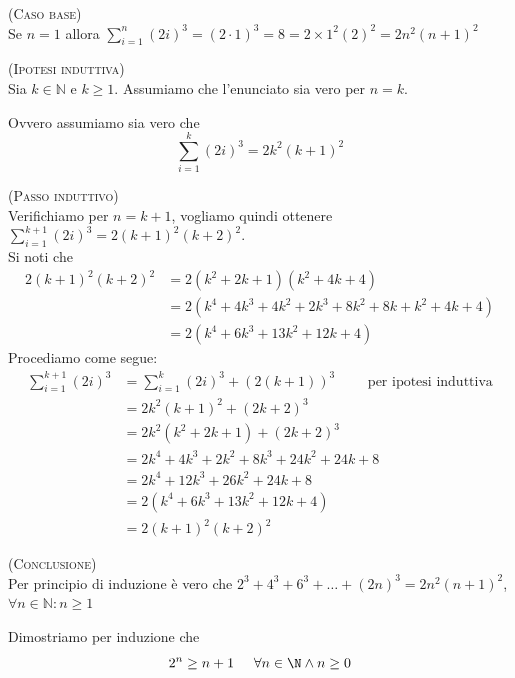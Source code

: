 \begin{soluzione}
\textsc{(Caso base)}\\
Se $n=1$ allora $\sum\limits_{i=1}^{n} (2i)^3 = (2\cdot 1)^3 = 8 =2 \times 1^2 (2)^2 = 2n^2(n+1)^2$

\textsc{(Ipotesi induttiva)}\\
Sia $k \in \mathbb{N}$ e $k \geqslant 1$. Assumiamo che l'enunciato sia vero per $n = k$.  

Ovvero assumiamo sia vero che $$\sum\limits_{i=1}^{k} (2i)^3 = 2k^2(k+1)^2$$

\textsc{(Passo induttivo)}\\

Verifichiamo per $n=k+1$, vogliamo quindi ottenere $\sum\limits_{i=1}^{k+1} (2i)^3 = 2(k+1)^2(k+2)^2$.\\
Si noti che 
\begin{align*}
2(k+1)^2(k+2)^2 &= 2(k^2+2k+1)(k^2+4k+4)\\
&= 2(k^4+4k^3+4k^2+2k^3+8k^2+8k+k^2+4k+4)\\
&= 2(k^4+6k^3+13k^2+12k+4)
\end{align*}
Procediamo come segue:
\begin{align*}
    \sum\limits_{i=1}^{k+1} (2i)^3 & = \sum\limits_{i=1}^{k} (2i)^3 + (2(k+1))^3\qquad \text{ per ipotesi induttiva}\\
    & = 2k^2(k+1)^2+(2k+2)^3\\
    & = 2k^2(k^2+2k+1)+(2k+2)^3\\
    & = 2k^4+4k^3+2k^2+8k^3+24k^2+24k+8\\
    & = 2k^4+12k^3+26k^2+24k+8\\
    & = 2(k^4+6k^3+13k^2+12k+4)\\ 
    & = 2(k+1)^2(k+2)^2
\end{align*}

\textsc{(Conclusione)}\\
Per principio di induzione è vero che $2^3 + 4^3 + 6^3 + \dots + (2n)^3 = 2n^2(n+1)^2$, $\forall n\in \mathbb{N}: n\geqslant1$\\
\end{soluzione}


\begin{esercizio}
Dimostriamo per induzione che
$$2^n\geq n+1 \hspace{.5cm} \forall n\in\N \land n\geq 0$$
\end{esercizio}

